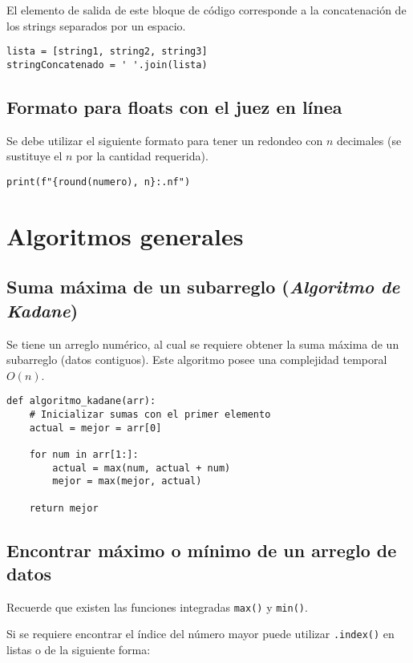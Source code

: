\documentclass[12pt,letterpaper]{article}
\begin{document}
El elemento de salida de este bloque de código corresponde a la concatenación de los strings separados por un espacio.

\begin{verbatim}
lista = [string1, string2, string3]
stringConcatenado = ' '.join(lista)
\end{verbatim}

\subsection{Formato para floats con el juez en línea}

Se debe utilizar el siguiente formato para tener un redondeo con $n$ decimales (se sustituye el $n$ por la cantidad requerida).

\begin{verbatim}
print(f"{round(numero), n}:.nf")
\end{verbatim}

\section{Algoritmos generales}

\subsection{Suma máxima de un subarreglo (\textit{Algoritmo de Kadane})}

Se tiene un arreglo numérico, al cual se requiere obtener la suma máxima de un subarreglo (datos contiguos).
Este algoritmo posee una complejidad temporal $O(n)$.

\begin{verbatim}
def algoritmo_kadane(arr):
    # Inicializar sumas con el primer elemento
    actual = mejor = arr[0]

    for num in arr[1:]:
        actual = max(num, actual + num)
        mejor = max(mejor, actual)

    return mejor
\end{verbatim}

\subsection{Encontrar máximo o mínimo de un arreglo de datos}

Recuerde que existen las funciones integradas \texttt{max()} y \texttt{min()}.

Si se requiere encontrar el índice del número mayor puede utilizar \texttt{.index()} en listas o de la siguiente forma:
\end{document}
